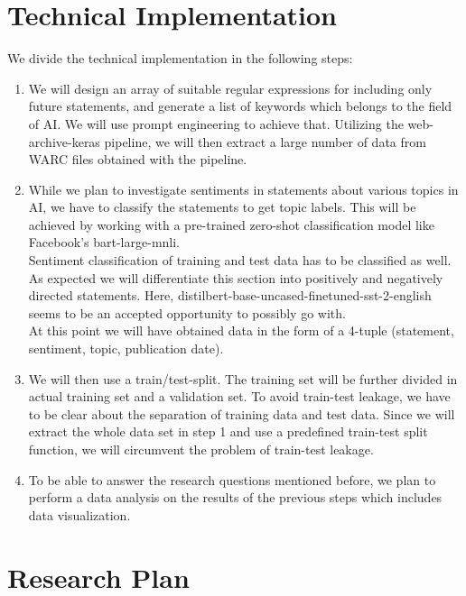 \documentclass[11pt]{article}
\begin{document}
\section{Technical Implementation}

We divide the technical implementation in the following steps:

\begin{enumerate}
\item We will design an array of suitable regular expressions for including only future statements, and generate a list of keywords which belongs to the field of AI. We will use prompt engineering to achieve that. Utilizing the web-archive-keras pipeline, we will then extract a large number of data from WARC files obtained with the pipeline.

\item While we plan to investigate sentiments in statements about various topics in AI, we have to classify the statements to get topic labels. This will be achieved by working with a pre-trained zero-shot classification model like Facebook’s bart-large-mnli.
\\ Sentiment classification of training and test data has to be classified as well. As expected we will differentiate this section into positively and negatively directed statements. Here, distilbert-base-uncased-finetuned-sst-2-english seems to be an accepted opportunity to possibly go with.
\\ At this point we will have obtained data in the form of a 4-tuple (statement, sentiment, topic, publication date).
    
\item We will then use a train/test-split. The training set will be further divided in actual training set and a validation set. To avoid train-test leakage, we have to be clear about the separation of training data and test data. Since we will extract the whole data set in step 1 and use a predefined train-test split function, we will circumvent the problem of train-test leakage.
\item To be able to answer the research questions mentioned before, we plan to perform a data analysis on the results of the previous steps which includes data visualization.
\end{enumerate}

\section{Research Plan}
\end{document}
